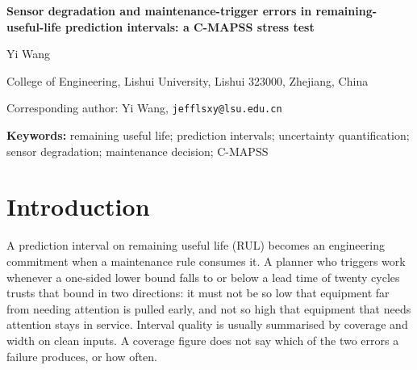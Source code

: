 \documentclass[11pt,a4paper]{article}
\newcommand{\JDriftPremRange}{52--69}
\newcommand{\JRevTotal}{36}
\newcommand{\JRevGroups}{96}
\newcommand{\JMatchBias}{0.71--0.78}
\newcommand{\JMatchDrift}{0.09--0.14}
\newcommand{\JCohNegUnrecSix}{4--15}
\newif\ifanon
\begin{document}
\onehalfspacing
\begin{center}
{\Large\bfseries Sensor degradation and maintenance-trigger errors in remaining-useful-life prediction intervals: a C-MAPSS stress test\par}
\vspace{0.6em}
\ifanon
{\small Original Research Article --- anonymised manuscript for review\par}
\else
{\normalsize Yi Wang\par}
{\small College of Engineering, Lishui University, Lishui 323000, Zhejiang, China\par}
{\small Corresponding author: Yi Wang, \texttt{jefflsxy@lsu.edu.cn}\par}
\fi
\end{center}
\vspace{0.4em}
\begin{abstract}\noindent
Maintenance rules often trigger work when a lower prediction bound on remaining useful life (RUL) falls to a lead time, yet interval quality is judged by clean-input coverage. This stress test asks how structured sensor degradation changes coverage and trigger errors. On C-MAPSS (four sub-datasets, two backbones, five interval mechanisms), noise, bias, drift and gain errors were applied to the sensor channels of each test engine's final window, and a one-sided 95\% lower bound was compared with lead times of 10, 20 and 30 cycles. At matched out-of-range input share, coverage differed widely between perturbation families: on FD002 at 10\% out-of-range inputs, drift gave \JMatchDrift{} and bias \JMatchBias. A positive drift on all sensor channels caused premature triggers in \JDriftPremRange\% of evaluated six-condition engines at a 20-cycle lead time and no unrecognised need, whereas a constant negative offset caused unrecognised needs in \JCohNegUnrecSix\%. Output swaps identified the mean shift as the main driver, with scale changes amplifying or offsetting it. Cost rankings of mechanisms changed across cost ratios in \JRevTotal{} of \JRevGroups{} settings, never under drift. Results are terminal-instant, simulated and partly exploratory; they support reporting both trigger errors beside coverage, not deployment guarantees.

\end{abstract}
\noindent\textbf{Keywords:} remaining useful life; prediction intervals; uncertainty quantification; sensor degradation; maintenance decision; C-MAPSS
\bigskip

\section{Introduction}
A prediction interval on remaining useful life (RUL) becomes an engineering commitment when a maintenance rule consumes it. A planner who triggers work whenever a one-sided lower bound falls to or below a lead time of twenty cycles trusts that bound in two directions: it must not be so low that equipment far from needing attention is pulled early, and not so high that equipment that needs attention stays in service. Interval quality is usually summarised by coverage and width on clean inputs. A coverage figure does not say which of the two errors a failure produces, or how often.
\end{document}
